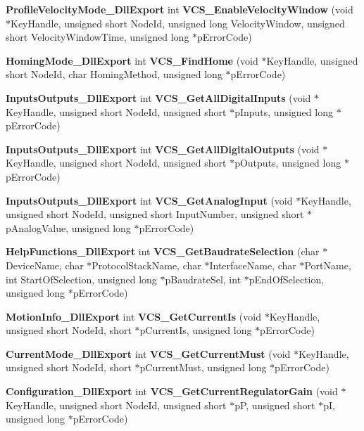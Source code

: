 \begin{DoxyCompactItemize}
\item 
{\bf \-Profile\-Velocity\-Mode\-\_\-\-Dll\-Export} int {\bf \-V\-C\-S\-\_\-\-Enable\-Velocity\-Window} (void $\ast$\-Key\-Handle, unsigned short \-Node\-Id, unsigned long \-Velocity\-Window, unsigned short \-Velocity\-Window\-Time, unsigned long $\ast$p\-Error\-Code)
\item 
{\bf \-Homing\-Mode\-\_\-\-Dll\-Export} int {\bf \-V\-C\-S\-\_\-\-Find\-Home} (void $\ast$\-Key\-Handle, unsigned short \-Node\-Id, char \-Homing\-Method, unsigned long $\ast$p\-Error\-Code)
\item 
{\bf \-Inputs\-Outputs\-\_\-\-Dll\-Export} int {\bf \-V\-C\-S\-\_\-\-Get\-All\-Digital\-Inputs} (void $\ast$\-Key\-Handle, unsigned short \-Node\-Id, unsigned short $\ast$p\-Inputs, unsigned long $\ast$p\-Error\-Code)
\item 
{\bf \-Inputs\-Outputs\-\_\-\-Dll\-Export} int {\bf \-V\-C\-S\-\_\-\-Get\-All\-Digital\-Outputs} (void $\ast$\-Key\-Handle, unsigned short \-Node\-Id, unsigned short $\ast$p\-Outputs, unsigned long $\ast$p\-Error\-Code)
\item 
{\bf \-Inputs\-Outputs\-\_\-\-Dll\-Export} int {\bf \-V\-C\-S\-\_\-\-Get\-Analog\-Input} (void $\ast$\-Key\-Handle, unsigned short \-Node\-Id, unsigned short \-Input\-Number, unsigned short $\ast$p\-Analog\-Value, unsigned long $\ast$p\-Error\-Code)
\item 
{\bf \-Help\-Functions\-\_\-\-Dll\-Export} int {\bf \-V\-C\-S\-\_\-\-Get\-Baudrate\-Selection} (char $\ast$\-Device\-Name, char $\ast$\-Protocol\-Stack\-Name, char $\ast$\-Interface\-Name, char $\ast$\-Port\-Name, int \-Start\-Of\-Selection, unsigned long $\ast$p\-Baudrate\-Sel, int $\ast$p\-End\-Of\-Selection, unsigned long $\ast$p\-Error\-Code)
\item 
{\bf \-Motion\-Info\-\_\-\-Dll\-Export} int {\bf \-V\-C\-S\-\_\-\-Get\-Current\-Is} (void $\ast$\-Key\-Handle, unsigned short \-Node\-Id, short $\ast$p\-Current\-Is, unsigned long $\ast$p\-Error\-Code)
\item 
{\bf \-Current\-Mode\-\_\-\-Dll\-Export} int {\bf \-V\-C\-S\-\_\-\-Get\-Current\-Must} (void $\ast$\-Key\-Handle, unsigned short \-Node\-Id, short $\ast$p\-Current\-Must, unsigned long $\ast$p\-Error\-Code)
\item 
{\bf \-Configuration\-\_\-\-Dll\-Export} int {\bf \-V\-C\-S\-\_\-\-Get\-Current\-Regulator\-Gain} (void $\ast$\-Key\-Handle, unsigned short \-Node\-Id, unsigned short $\ast$p\-P, unsigned short $\ast$p\-I, unsigned long $\ast$p\-Error\-Code)
\item 

\end{DoxyCompactItemize}
